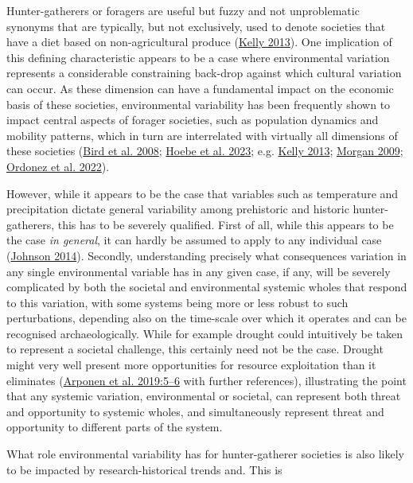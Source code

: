 \documentclass[
  a4paper,
  oneside]{uiophdthesis}
\begin{document}
Hunter-gatherers or foragers are useful but fuzzy and not unproblematic synonyms that are typically, but not exclusively, used to denote societies that have a diet based on non-agricultural produce (\protect\hyperlink{ref-kelly2013}{Kelly 2013}). One implication of this defining characteristic appears to be a case where environmental variation represents a considerable constraining back-drop against which cultural variation can occur. As these dimension can have a fundamental impact on the economic basis of these societies, environmental variability has been frequently shown to impact central aspects of forager societies, such as population dynamics and mobility patterns, which in turn are interrelated with virtually all dimensions of these societies (\protect\hyperlink{ref-bird2008}{Bird et al. 2008}; \protect\hyperlink{ref-hoebe2023}{Hoebe et al. 2023}; e.g. \protect\hyperlink{ref-kelly2013}{Kelly 2013}; \protect\hyperlink{ref-morgan2009}{Morgan 2009}; \protect\hyperlink{ref-ordonez2022}{Ordonez et al. 2022}).

However, while it appears to be the case that variables such as temperature and precipitation dictate general variability among prehistoric and historic hunter-gatherers, this has to be severely qualified. First of all, while this appears to be the case \emph{in general}, it can hardly be assumed to apply to any individual case (\protect\hyperlink{ref-johnson2014}{Johnson 2014}). Secondly, understanding precisely what consequences variation in any single environmental variable has in any given case, if any, will be severely complicated by both the societal and environmental systemic wholes that respond to this variation, with some systems being more or less robust to such perturbations, depending also on the time-scale over which it operates and can be recognised archaeologically. While for example drought could intuitively be taken to represent a societal challenge, this certainly need not be the case. Drought might very well present more opportunities for resource exploitation than it eliminates (\protect\hyperlink{ref-arponen2019}{Arponen et al. 2019:5--6} with further references), illustrating the point that any systemic variation, environmental or societal, can represent both threat and opportunity to systemic wholes, and simultaneously represent threat and opportunity to different parts of the system.

What role environmental variability has for hunter-gatherer societies is also likely to be impacted by research-historical trends and. This is
\end{document}

